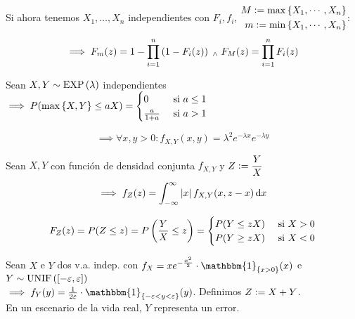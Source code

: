 Si ahora tenemos $X_1, \dots, X_n$ independientes con $F_i, f_i$, $\begin{aligned}
		M\vcentcolon= \max{\{X_1, \cdots, X_n\}} \\
		m\vcentcolon= \min{\{X_1, \cdots, X_n\}}
	\end{aligned}$:
\[\implies F_m(z) = 1-\prod_{i=1}^n \left(1- F_i(z)\right) \; _{\wedge} \; F_M(z) = \prod_{i=1}^n F_i(z)\]

 Sean $X, Y \sim \operatorname{EXP}\left(\lambda\right)$ independientes $\displaystyle \implies P(\max{\{X, Y\}} \leq aX) = \begin{cases}
		0             & \text{ si } a \leq 1 \\
		\frac{a}{1+a} & \text{ si } a > 1
	\end{cases}$
\begin{dem}
	\[\implies \forall x, y > 0 : f_{X, Y} (x, y) = \lambda^2 e^{-\lambda x} e^{-\lambda y}\]
\end{dem}

 Sean $X, Y$ con función de densidad conjunta $f_{X, Y}$ y $\displaystyle Z\vcentcolon= \frac{Y}{X}$
\[\implies f_{Z}(z) = \int_{-\infty}^{\infty} \abs{x} f_{X, Y} (x, z-x) \odif{x}\]
\begin{dem}
	\[F_Z(z)=P(Z\leq z) = P\left(\frac{Y}{X} \leq z\right) = \begin{cases}
			P(Y \leq zX) & \text{ si } X > 0 \\
			P(Y \geq zX) & \text{ si } X < 0
		\end{cases}\]
\end{dem}

 Sean $X$ e $Y$ dos v.a. indep. con $\ds f_X = xe^{-\frac{x^2}{2}} \cdot \mathbbm{1}_{\{x>0\}}(x)$ e $Y\sim\operatorname{UNIF}\left([-\varepsilon,\varepsilon]\right)$\\ $\implies f_Y(y) =\frac{1}{2\varepsilon} \cdot \mathbbm{1}_{\{-\varepsilon<y<\varepsilon\}}(y)$. Definimos $Z\vcentcolon= X+Y$. \\
\hspace*{\fill}  En un escenario de la vida real, $Y$ representa un error.

